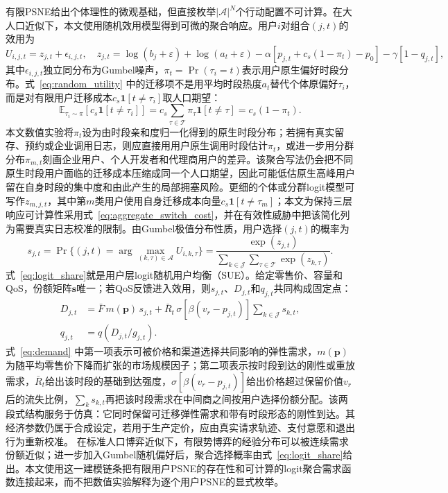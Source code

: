 \documentclass[UTF8,11pt]{ctexart}
\newcommand{\qos}{q}
\newcommand{\T}{\mathcal{T}}
\newcommand{\J}{\mathcal{J}}
\newcommand{\A}{\mathcal{A}}
\newcommand{\D}{D}
\newcommand{\p}{\boldsymbol{p}}
\begin{document}
有限PSNE给出个体理性的微观基础，但直接枚举$|\A|^N$个行动配置不可计算。在大人口近似下，本文使用随机效用模型得到可微的聚合响应。用户$i$对组合$(j,t)$的效用为
\begin{equation}
  U_{i,j,t}=z_{j,t}+\epsilon_{i,j,t},
  \quad
  z_{j,t}=\log(b_j+\varepsilon)+\log(a_t+\varepsilon)
  -\alpha\left[p_{j,t}+c_s(1-\pi_t)-p_0\right]
  -\gamma[1-q_{j,t}],
  \label{eq:random_utility}
\end{equation}
其中$\epsilon_{i,j,t}$独立同分布为Gumbel噪声，$\pi_t=\Pr(\tau_i=t)$表示用户原生偏好时段分布。式~\eqref{eq:random_utility} 中的迁移项不是用平均时段热度$a_t$替代个体原偏好$\tau_i$，而是对有限用户迁移成本$c_s\mathbf{1}[t\ne\tau_i]$取人口期望：
\begin{equation}
  \mathbb{E}_{\tau_i\sim\pi}\!\left[c_s\mathbf{1}[t\ne\tau_i]\right]
  =c_s\sum_{\tau\in\T}\pi_\tau\mathbf{1}[t\ne\tau]
  =c_s(1-\pi_t).
  \label{eq:aggregate_switch_cost}
\end{equation}
本文数值实验将$\pi_t$设为由时段亲和度归一化得到的原生时段分布；若拥有真实留存、预约或企业调用日志，则应直接用用户原生调用时段估计$\pi_t$，或进一步用分群分布$\pi_{m,t}$刻画企业用户、个人开发者和代理商用户的差异。该聚合写法仍会把不同原生时段用户面临的迁移成本压缩成同一个人口期望，因此可能低估原生高峰用户留在自身时段的集中度和由此产生的局部拥塞风险。更细的个体或分群logit模型可写作$z_{m,j,t}$，其中第$m$类用户使用自身迁移成本向量$c_s\mathbf{1}[t\ne\tau_m]$；本文为保持三层响应可计算性采用式~\eqref{eq:aggregate_switch_cost}，并在有效性威胁中把该简化列为需要真实日志校准的限制。由Gumbel极值分布性质，用户选择$(j,t)$的概率为
\begin{equation}
  s_{j,t}=\Pr\{(j,t)=\arg\max_{(k,\tau)\in\A}U_{i,k,\tau}\}
  =\frac{\exp(z_{j,t})}{\sum_{k\in\J}\sum_{\tau\in\T}\exp(z_{k,\tau})}.
  \label{eq:logit_share}
\end{equation}
式~\eqref{eq:logit_share}就是用户层logit随机用户均衡（SUE）。给定零售价、容量和QoS，份额矩阵$\boldsymbol{s}$唯一；若QoS反馈进入效用，则$s_{j,t}$、$\D_{j,t}$和$q_{j,t}$共同构成固定点：
\begin{align}
  \D_{j,t}&=\bar F\,m(\p)\,s_{j,t}
  +\bar R_t\,\sigma[\beta(v_r-p_{j,t})]\sum_{k\in\J}s_{k,t}, \label{eq:demand}\\
  q_{j,t}&=\qos(\D_{j,t}/g_{j,t}). \label{eq:qos_fixed}
\end{align}
式~\eqref{eq:demand} 中第一项表示可被价格和渠道选择共同影响的弹性需求，$m(\p)$为随平均零售价下降而扩张的市场规模因子；第二项表示按时段到达的刚性或重放需求，$\bar R_t$给出该时段的基础到达强度，$\sigma[\beta(v_r-p_{j,t})]$给出价格超过保留价值$v_r$后的流失比例，$\sum_k s_{k,t}$再把该时段需求在中间商之间按用户选择份额分配。该两段式结构服务于仿真：它同时保留可迁移弹性需求和带有时段形态的刚性到达。其经济参数仍属于合成设定，若用于生产定价，应由真实请求轨迹、支付意愿和退出行为重新校准。
在标准人口博弈近似下，有限势博弈的经验分布可以被连续需求份额近似；进一步加入Gumbel随机偏好后，聚合选择概率由式~\eqref{eq:logit_share}给出。本文使用这一建模链条把有限用户PSNE的存在性和可计算的logit聚合需求函数连接起来，而不把数值实验解释为逐个用户PSNE的显式枚举。
\end{document}
